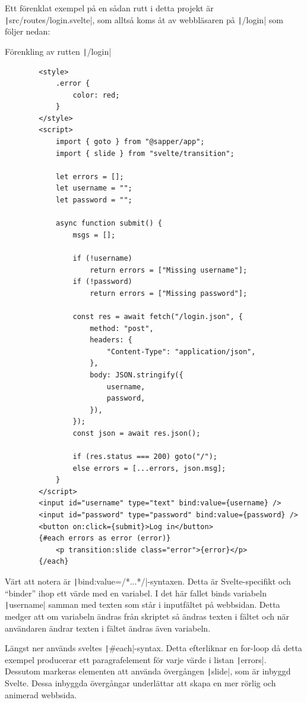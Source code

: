 \documentclass{article}
\begin{document}
Ett förenklat exempel på en sådan rutt i detta projekt är
\texttt|src/routes/login.svelte|, som alltså koms åt av
webbläsaren på \texttt|/login| som följer nedan:

\begin{listing}[H]
	\caption{Förenkling av rutten \texttt|/login|}
	\begin{verbatim}
		<style>
			.error {
				color: red;
			}
		</style>
		<script>
			import { goto } from "@sapper/app";
			import { slide } from "svelte/transition";

			let errors = [];
			let username = "";
			let password = "";

			async function submit() {
				msgs = [];

				if (!username)
					return errors = ["Missing username"];
				if (!password)
					return errors = ["Missing password"];

				const res = await fetch("/login.json", {
					method: "post",
					headers: {
						"Content-Type": "application/json",
					},
					body: JSON.stringify({
						username,
						password,
					}),
				});
				const json = await res.json();

				if (res.status === 200) goto("/");
				else errors = [...errors, json.msg];
			}
		</script>
		<input id="username" type="text" bind:value={username} />
		<input id="password" type="password" bind:value={password} />
		<button on:click={submit}>Log in</button>
		{#each errors as error (error)}
			<p transition:slide class="error">{error}</p>
		{/each}
	\end{verbatim}
\end{listing}

Värt att notera är
\texttt|bind:value={/*...*/}|-syntaxen. Detta är
Svelte-specifikt och ``binder'' ihop ett värde med en variabel. I det här fallet
binds variabeln \texttt|username| samman med texten som
står i inputfältet på webbsidan. Detta medger att om variabeln ändras från
skriptet så ändras texten i fältet och när användaren ändrar texten i fältet
ändras även variabeln.

Längst ner används sveltes \texttt|#each|-syntax. Detta
efterliknar en for-loop då detta exempel producerar ett paragrafelement för
varje värde i listan \texttt|errors|. Dessutom markeras
elementen att använda övergången \texttt|slide|, som är
inbyggd Svelte. Dessa inbyggda övergångar underlättar att skapa en mer
rörlig och animerad webbsida.
\end{document}
